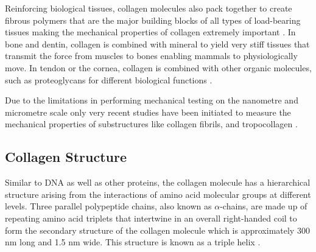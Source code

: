 Reinforcing biological tissues, collagen molecules also pack together to create fibrous polymers that are the major building blocks of all types of load-bearing tissues making the mechanical properties of collagen extremely important \cite{Buehler2006}. In bone and dentin, collagen is combined with mineral to yield very stiff tissues that transmit the force from muscles to bones enabling mammals to physiologically move. In tendon or the cornea, collagen is combined with other organic molecules, such as proteoglycans for different biological functions \cite{Fratzl2008,Bozec2005a,Bozec2007,Ottani2001}.

Due to the limitations in performing mechanical testing on the nanometre and micrometre scale only very recent studies have been initiated to measure the mechanical properties of substructures like collagen fibrils, and tropocollagen \cite{Bozec2005a,Bozec2007,Buehler2006a}.

\subsection{Collagen Structure}

Similar to DNA as well as other proteins, the collagen molecule has a hierarchical structure arising from the interactions of amino acid molecular groups at different levels. Three parallel polypeptide chains, also known as $\alpha$-chains, are made up of repeating amino acid triplets that intertwine in an overall right-handed coil to form the secondary structure of the collagen molecule which is approximately 300 nm long and 1.5 nm wide. This structure is known as a triple helix \cite{Shoulders2009,Fratzl2008,Berg2010,Brinckmann2005,Ramachandran1954,Ottani2001,Bozec2005a,Bozec2007,Buehler2006a}.


